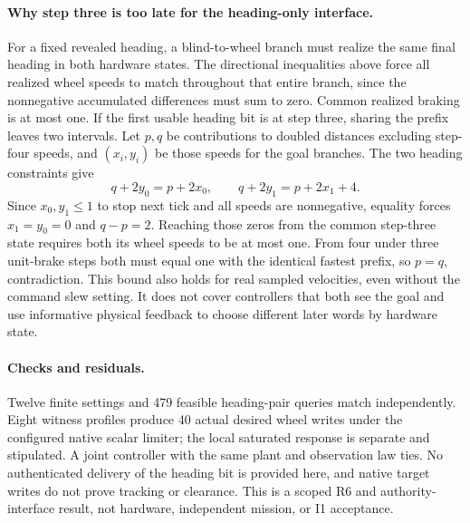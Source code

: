 \documentclass{article}
\begin{document}
\paragraph{Why step three is too late for the heading-only interface.}
For a fixed revealed heading, a blind-to-wheel branch must realize
the same final heading in both hardware states. The directional
inequalities above force all realized wheel speeds to match
throughout that entire branch, since the nonnegative accumulated
differences must sum to zero. Common realized braking is at most
one. If the first usable heading bit is at step three, sharing the
prefix leaves two intervals. Let \(p,q\) be contributions to
doubled distances excluding step-four speeds, and \((x_i,y_i)\)
be those speeds for the goal branches. The two heading
constraints give
\[
q+2y_0=p+2x_0,\qquad q+2y_1=p+2x_1+4.
\]
Since \(x_0,y_1\le1\) to stop next tick and all speeds are
nonnegative, equality forces \(x_1=y_0=0\) and \(q-p=2\).
Reaching those zeros from the common step-three state requires
both its wheel speeds to be at most one. From four under three
unit-brake steps both must equal one with the identical fastest
prefix, so \(p=q\), contradiction. This bound also holds for
real sampled velocities, even without the command slew setting.
It does not cover controllers that both see the goal and use
informative physical feedback to choose different later words
by hardware state.

\paragraph{Checks and residuals.}
Twelve finite settings and 479 feasible heading-pair queries
match independently. Eight witness profiles produce 40 actual
desired wheel writes under the configured native scalar limiter;
the local saturated response is separate and stipulated. A
joint controller with the same plant and observation law ties.
No authenticated delivery of the heading bit is provided here,
and native target writes do not prove tracking or clearance.
This is a scoped R6 and authority-interface result, not hardware,
independent mission, or I1 acceptance.
\end{document}
